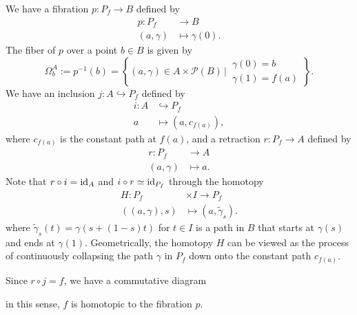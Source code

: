     We have a fibration $p: P_f \to B$ defined by
    \begin{align*}
        p: P_f &\to B \\
        (a,\gamma) &\mapsto \gamma(0).
    \end{align*}
    The fiber of $p$ over a point $b\in B$ is given by
    \begin{equation*}
        \Omega_{b}^{A}:=p^{-1}(b)
            =\left\{(a,\gamma)\in A\times\mathcal{P}(B)\,\Bigg|\,
            \begin{array}{l}
                \gamma(0)=b \\
                \gamma(1)=f(a)
            \end{array}
            \right\}.
    \end{equation*}
    We have an inclusion $j: A\hookrightarrow P_f$ defined by
    \begin{align*}
        i:A&\hookrightarrow P_f \\
        a &\mapsto(a,c_{f(a)}),
    \end{align*}
    where $c_{f(a)}$ is the constant path at $f(a)$,
    and a retraction $r: P_f \to A$ defined by
    \begin{align*}
        r: P_f &\to A \\
        (a,\gamma) &\mapsto a.
    \end{align*}
    Note that $r\circ i = {\rm id}_A$ and $i\circ r \simeq {\rm id}_{P_f}$
    through the homotopy
    \begin{align*}
        H: P_f &\times I \to P_f \\
        ((a,\gamma),s) &\mapsto (a,\tilde{\gamma}_s).
    \end{align*}
    where $\tilde{\gamma}_s(t)=\gamma(s+(1-s)t)$ for $t\in I$ is 
    a path in $B$ that starts at $\gamma(s)$ and ends at $\gamma(1)$.
    Geometrically, the homotopy $H$ can be viewed as 
    the process of continuously collapsing 
    the path $\gamma$ in $P_f$ down onto 
    the constant path $c_{f(a)}$.

    Since $r\circ j = f$, we have a commutative diagram
    \begin{center}
    \end{center}
    in this sense, $f$ is homotopic to the fibration $p$. 

